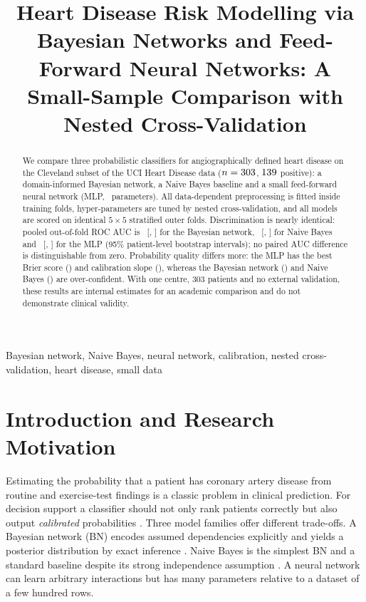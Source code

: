 \documentclass[conference]{IEEEtran}
\begin{document}
\title{Heart Disease Risk Modelling via Bayesian Networks and Feed-Forward Neural Networks: A Small-Sample Comparison with Nested Cross-Validation}

\author{
}

\maketitle

\begin{abstract}
We compare three probabilistic classifiers for angiographically defined heart disease on the Cleveland subset of the UCI Heart Disease data ($n=303$, $139$ positive): a domain-informed Bayesian network, a Naive Bayes baseline and a small feed-forward neural network (MLP, \nParamsMLP\ parameters). All data-dependent preprocessing is fitted inside training folds, hyper-parameters are tuned by nested cross-validation, and all models are scored on identical $5\times5$ stratified outer folds. Discrimination is nearly identical: pooled out-of-fold ROC AUC is \BNrocaucEst\ [\BNrocaucCILo, \BNrocaucCIHi] for the Bayesian network, \NBrocaucEst\ [\NBrocaucCILo, \NBrocaucCIHi] for Naive Bayes and \MLProcaucEst\ [\MLProcaucCILo, \MLProcaucCIHi] for the MLP (95\% patient-level bootstrap intervals); no paired AUC difference is distinguishable from zero. Probability quality differs more: the MLP has the best Brier score (\MLPbrierEst) and calibration slope (\MLPcalslopePMean), whereas the Bayesian network (\BNcalslopePMean) and Naive Bayes (\NBcalslopePMean) are over-confident. With one centre, 303 patients and no external validation, these results are internal estimates for an academic comparison and do not demonstrate clinical validity.
\end{abstract}

\begin{IEEEkeywords}
Bayesian network, Naive Bayes, neural network, calibration, nested cross-validation, heart disease, small data
\end{IEEEkeywords}

\section{Introduction and Research Motivation}
Estimating the probability that a patient has coronary artery disease from routine and exercise-test findings is a classic problem in clinical prediction. For decision support a classifier should not only rank patients correctly but also output \emph{calibrated} probabilities \cite{steyerberg2010,vancalster2019}. Three model families offer different trade-offs. A Bayesian network (BN) encodes assumed dependencies explicitly and yields a posterior distribution by exact inference \cite{pearl1988,koller2009}. Naive Bayes is the simplest BN and a standard baseline despite its strong independence assumption \cite{domingos1997}. A neural network can learn arbitrary interactions but has many parameters relative to a dataset of a few hundred rows.
\end{document}
